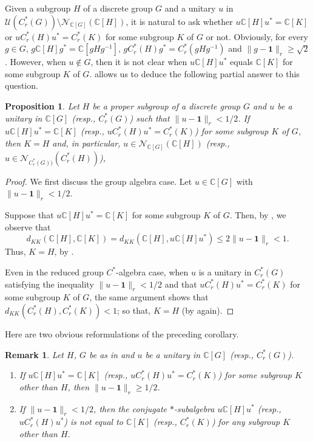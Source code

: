 \documentclass{amsart}
\numberwithin{equation}{section}
\newcommand{\mcal}{\mathcal}
\newcommand{\mbb}{\mathbb}
\newcommand{\C}{\mathbb C}
\newcommand{\1}{\mathbf{1}}
\newcommand{\mU}{\mathcal{U}}
\newtheorem{proposition}[theorem]{Proposition}
\newtheorem{remark}[theorem]{Remark}
\begin{document}
Given a subgroup $H$ of a discrete group $G$ and a unitary $u$ in
$\mU(C^*_r(G))\setminus \mcal{N}_{\C[G]}(\C[H])$, it is natural to ask
whether $u \C[H] u^* = \C[K]$ or $u C^*_r(H) u^* = C^*_r(K)$ for some
subgroup $K$ of $G$ or not. Obviously, for every $g \in G$, $g \C[H]
g^* = \C[gHg^{-1}]$, $g C^*_r(H) g^* = C^*_r(gHg^{-1})$ and $\|g -
\1\|_r \geq \sqrt{2}$.  However, when $u\notin G$, then it is not
clear when $u\C[H] u^*$ equals $\C[K]$ for some subgroup $K$ of
$G$.  allows us to deduce the following
partial answer to this question.

\begin{proposition}\label{CH-conjugate}
Let $H$ be a  proper subgroup of a  discrete group $G$ and $u$
be a unitary in $\C[G]$ (resp., $C^*_r(G)$) such that $\|u - \1\|_r <
1/2$. If $u\mbb{C}[H]u^{*} = \mbb{C}[K]$ (resp., $ uC^*_r(H) u^* =
C^*_r(K)$) for some subgroup $K$ of $G$, then $K = H$ and, in particular, 
$u \in \mathcal{N}_{\C[G]}(\C[H])$ (resp., $u \in
\mathcal{N}_{C^*_r(G))}(C^*_r(H))$), 
\end{proposition}

\begin{proof}
We first discuss the group algebra case. Let $u \in \C[G]$ with $\|u -
\1\|_r < 1/2$.

Suppose that $u\mbb{C}[H]u^{*} = \mbb{C}[K]$ for some subgroup $K$ of
$G$. Then, by , we observe that
\[
d_{KK}(\C[H], \C[K]) =  d_{KK}(\C[H], u \C[H] u^*) \leq 2 \|u - \1\|_r < 1.
\]
Thus,  $K = H$, by . 

Even in the reduced group $C^*$-algebra case, when $u$ is a unitary in
$C^*_r(G)$ satisfying the inequality $\|u - \1\|_r < 1/2$ and that $
uC^*_r(H) u^* = C^*_r(K)$ for some subgroup $K$ of $G$, the same
argument shows that $ d_{KK}( C^*_r(H), C^*_r(K))<1$; so that, $K = H$
(by  again).
\end{proof}

Here are two obvious reformulations of the preceding corollary.
\begin{remark}
  Let $H$, $G$ be as in  and
  $u$ be a unitary in $\C[G]$ (resp., $C^*_r(G)$).
\begin{enumerate}
\item If $u \C[H] u^* = \C[K]$ (resp., $u C^*_r(H) u^* = C^*_r(K)$)
  for some subgroup $K$ other than $H$, then $\|u - \1\|_r \geq 1/2$.
\item   If $\|u - \1\|_r< 1/2$, then the conjugate $*$-subalgebra $u
  \C[H] u^*$ (resp., $u C^*_r(H) u^*$) is not equal to $\C[K]$ (resp.,
  $C^*_r(K)$) for any subgroup $K$ other than $H$. 
\end{enumerate}
\end{remark}
 
\end{document}
